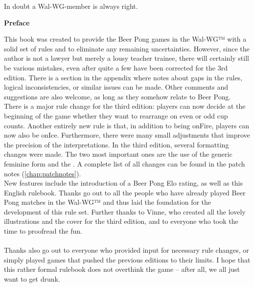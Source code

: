 \documentclass[a5paper, 12pt]{book}
\begin{document}
\begin{center}
\vspace*{2.5cm}
\par
\smallskip
\large{In doubt a Wal-WG\texttrademark-member is always right.}\label{Vorwort}
\end{center}
\restoregeometry
\pagebreak
\begin{Large} \textbf{Preface\\}
\end{Large}
This book was created to provide the Beer Pong games in the Wal-WG™ with a solid set of rules and to eliminate any remaining uncertainties. However, since the author is not a lawyer but merely a lousy teacher trainee, there will certainly still be various mistakes, even after quite a few have been corrected for the 3rd edition. There is a section in the appendix where notes about gaps in the rules, logical inconsistencies, or similar issues can be made. Other comments and suggestions are also welcome, as long as they somehow relate to Beer Pong.\\
There is a major rule change for the third edition: players can now decide at the beginning of the game whether they want to rearrange on even or odd cup counts. Another entirely new rule is that, in addition to being onFire, players can now also be onIce. Furthermore, there were many small adjustments that improve the precision of the interpretations.
In the third edition, several formatting changes were made. The two most important ones are the use of the generic feminine form and the \texttrademark. A complete list of all changes can be found in the patch notes (\ref{chap:patchnotes}).\\
New features include the introduction of a Beer Pong Elo rating, as well as this English rulebook.
Thanks go out to all the people who have already played Beer Pong matches in the Wal-WG™ and thus laid the foundation for the development of this rule set. Further thanks to Vinne, who created all the lovely illustrations and the cover for the third edition, and to everyone who took the time to proofread the fun.\\\\
Thanks also go out to everyone who provided input for necessary rule changes, or simply played games that pushed the previous editions to their limits.
I hope that this rather formal rulebook does not overthink the game – after all, we all just want to get drunk.

\tableofcontents
\cleardoublepage
{}
\end{document}
